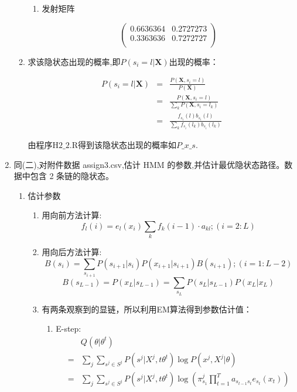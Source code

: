 \documentclass{ctexart}
\begin{document}
\begin{enumerate}
\begin{enumerate}
\begin{enumerate}
\item 发射矩阵

\begin{equation*}
\left(
\begin{array}{ccc}
    0.6636364 & 0.2727273  \\
   0.3363636 & 0.7272727 \\
   \end{array}
   \right)
  \end{equation*}

\end{enumerate}

\item 求该隐状态出现的概率,即\(P(s_i=l | \bm{X})\)出现的概率：

\begin{eqnarray*}
P(s_i=l | \bm{X})&=& \frac{P(\bm{X},s_i=l)}{P(\bm{X})}\\
&=& \frac{P(\bm{X},s_i=l)}{\sum_k P(\bm{X},s_i = l_k)}\\
&=& \frac{f_{s_i}(l)b_{s_i}(l)}{\sum_k f_{s_i}(l_k)b_{s_i}(l_k)}
\end{eqnarray*}

由程序\(\mbox{H}2\_2.\mbox{R}\)得到该隐状态出现的概率如\(P\_x\_s\).

\end{enumerate}

\item 同(二),对附件数据 assign3.csv,估计 HMM 的参数,并估计最优隐状态路径。数据中包含 2 条链的隐状态。

\begin{enumerate}
\item
估计参数

\begin{enumerate}
\item 用向前方法计算:
\[f_l(i)=e_l(x_i)\sum_k f_k(i-1)\cdot a_{kl} ;(i=2 :L)\]
\item 用向后方法计算:
\[B(s_i)=\sum_{s_{i+1}}P(s_{i+1}|s_i)P(x_{i+1}|s_{i+1})B(s_{i+1});(i=1:L-2) \]
\[B(s_{L-1})=P(x_L|s_{L-1})=\sum_{s_L} P(s_L|s_{L-1})P(x_L|x_L)\]
\item 有两条观察到的显链，所以利用EM算法得到参数估计值：
\begin{enumerate}
\item E-step:
\begin{eqnarray*}
& &Q(\theta|\theta^t)\\
&=&\sum_j \sum_{s^j\in S^j}P(s^j|X^j,t\theta^t)\log P(x^j,X^j|\theta)\\
&=& \sum_j \sum_{s^j \in S^j} P(s^j|X^j,t\theta^t) \log(\pi_{s_1}^j \prod_{t=1}^T a_{s_{t-1} s_t} e_{s_t}(x_t))
\end{eqnarray*}


\end{enumerate}
\end{enumerate}
\end{enumerate}
\end{enumerate}
\end{document}

